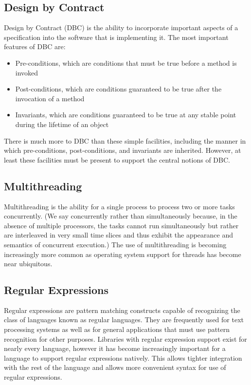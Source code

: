 \documentclass[12pt,a4paper,final,twoside,titlepage]{book}
\begin{document}
\subsection{Design by Contract}
Design by Contract (DBC) is the ability to incorporate important aspects of a specification into the software that is implementing it. The most important features of DBC are:
\begin{itemize}
\item Pre-conditions, which are conditions that must be true before a method is invoked
\item Post-conditions, which are conditions guaranteed to be true after the invocation of a method
\item Invariants, which are conditions guaranteed to be true at any stable point during the lifetime of an object
\end{itemize}
There is much more to DBC than these simple facilities, including the manner in which pre-conditions, post-conditions, and invariants are inherited. However, at least these facilities must be present to support the central notions of DBC.

\subsection{Multithreading}
Multithreading is the ability for a single process to process two or more tasks concurrently. (We say concurrently rather than simultaneously because, in the absence of multiple processors, the tasks cannot run simultaneously but rather are interleaved in very small time slices and thus exhibit the appearance and semantics of concurrent execution.) The use of multithreading is becoming increasingly more common as operating system support for threads has become near ubiquitous.

\subsection{Regular Expressions}
Regular expressions are pattern matching constructs capable of recognizing the class of languages known as regular languages. They are frequently used for text processing systems as well as for general applications that must use pattern recognition for other purposes. Libraries with regular expression support exist for nearly every language, however it has become increasingly important for a language to support regular expressions natively. This allows tighter integration with the rest of the language and allows more convenient syntax for use of regular expressions. 
\end{document}
